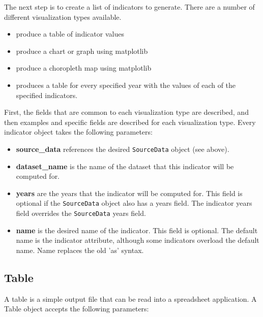 The next step is to create a list of indicators to generate. There are a 
number of different visualization types available. 

\begin{itemize}
\tight
\item {\bf {}}  produce a table  of indicator \indicatorsindex values
\item {\bf {}}  produce a chart  or graph  using matplotlib \matplotlibindex
\item {\bf {}}  produce a choropleth map  using matplotlib \matplotlibindex
\item {\bf {}} produces a table for every specified year 
with the values of each of the specified indicators.
\end{itemize}

First, the fields 
that are common to each visualization type are described, and then examples and
specific fields are described for each visualization type. Every indicator 
object takes the following parameters:

\begin{itemize}
\tight
\item {\bf source_data} references the desired \verb|SourceData| object (see above). 

\item {\bf dataset_name} is the name of the dataset that this indicator will be 
computed for.

\item {\bf years} are the years that the indicator will be computed for.
This field is optional if the \verb|SourceData| object also 
has a years field. The indicator years field overrides
the \verb|SourceData| years field.

\item {\bf name} is the desired name of the indicator. This field is optional. 
The default name is the indicator attribute, although 
some indicators overload the default name. Name replaces 
the old 'as' syntax.

\end{itemize}

\subsection{Table}
A table is a simple output file that can be read into a spreadsheet application. 
A Table object accepts the following parameters:

